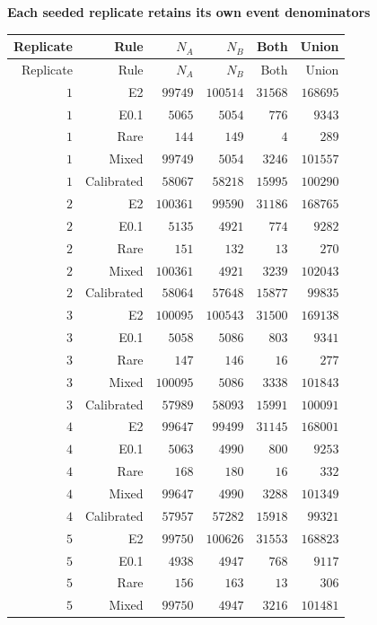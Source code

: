 
\begingroup\small
\setlength{\tabcolsep}{4pt}
\noindent\textbf{Each seeded replicate retains its own event denominators}
\begin{longtable}{rrrrrr}
\toprule
Replicate & Rule & $N_A$ & $N_B$ & Both & Union \\
\midrule
\endfirsthead
Replicate & Rule & $N_A$ & $N_B$ & Both & Union \\
\midrule
\endhead
\bottomrule
\endfoot
$1$ & E2 & $99749$ & $100514$ & $31568$ & $168695$ \\
$1$ & E0.1 & $5065$ & $5054$ & $776$ & $9343$ \\
$1$ & Rare & $144$ & $149$ & $4$ & $289$ \\
$1$ & Mixed & $99749$ & $5054$ & $3246$ & $101557$ \\
$1$ & Calibrated & $58067$ & $58218$ & $15995$ & $100290$ \\
$2$ & E2 & $100361$ & $99590$ & $31186$ & $168765$ \\
$2$ & E0.1 & $5135$ & $4921$ & $774$ & $9282$ \\
$2$ & Rare & $151$ & $132$ & $13$ & $270$ \\
$2$ & Mixed & $100361$ & $4921$ & $3239$ & $102043$ \\
$2$ & Calibrated & $58064$ & $57648$ & $15877$ & $99835$ \\
$3$ & E2 & $100095$ & $100543$ & $31500$ & $169138$ \\
$3$ & E0.1 & $5058$ & $5086$ & $803$ & $9341$ \\
$3$ & Rare & $147$ & $146$ & $16$ & $277$ \\
$3$ & Mixed & $100095$ & $5086$ & $3338$ & $101843$ \\
$3$ & Calibrated & $57989$ & $58093$ & $15991$ & $100091$ \\
$4$ & E2 & $99647$ & $99499$ & $31145$ & $168001$ \\
$4$ & E0.1 & $5063$ & $4990$ & $800$ & $9253$ \\
$4$ & Rare & $168$ & $180$ & $16$ & $332$ \\
$4$ & Mixed & $99647$ & $4990$ & $3288$ & $101349$ \\
$4$ & Calibrated & $57957$ & $57282$ & $15918$ & $99321$ \\
$5$ & E2 & $99750$ & $100626$ & $31553$ & $168823$ \\
$5$ & E0.1 & $4938$ & $4947$ & $768$ & $9117$ \\
$5$ & Rare & $156$ & $163$ & $13$ & $306$ \\
$5$ & Mixed & $99750$ & $4947$ & $3216$ & $101481$ \\

\end{longtable}
